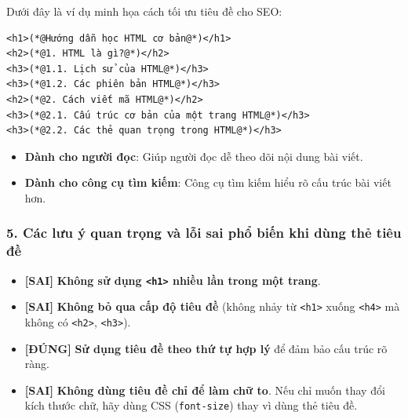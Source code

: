 \documentclass[11pt,oneside]{book}
\newcommand{\codeinline}[1]{\textcolor{accentOrange}{\texttt{#1}}}
\begin{document}
Dưới đây là ví dụ minh họa cách tối ưu tiêu đề cho SEO:

\begin{codeWindow}
\begin{lstlisting}[language=HTML5]
<h1>(*@Hướng dẫn học HTML cơ bản@*)</h1>
<h2>(*@1. HTML là gì?@*)</h2>
<h3>(*@1.1. Lịch sử của HTML@*)</h3>
<h3>(*@1.2. Các phiên bản HTML@*)</h3>
<h2>(*@2. Cách viết mã HTML@*)</h2>
<h3>(*@2.1. Cấu trúc cơ bản của một trang HTML@*)</h3>
<h3>(*@2.2. Các thẻ quan trọng trong HTML@*)</h3>
\end{lstlisting}
\end{codeWindow}

\begin{tipBox}
\begin{itemize}[leftmargin=1.5em, itemsep=2pt, parsep=0pt]
    \item \textbf{Dành cho người đọc}: Giúp người đọc dễ theo dõi nội dung bài viết.
    \item \textbf{Dành cho công cụ tìm kiếm}: Công cụ tìm kiếm hiểu rõ cấu trúc bài viết hơn.
\end{itemize}
\end{tipBox}

\subsubsection{5. Các lưu ý quan trọng và lỗi sai phổ biến khi dùng thẻ tiêu đề}

\begin{warnBox}
\begin{itemize}[leftmargin=1.5em, itemsep=3pt, parsep=0pt]
    \item \textcolor{codeKeyword}{\textbf{[SAI]}} \textbf{Không sử dụng \codeinline{<h1>} nhiều lần trong một trang}.
    \item \textcolor{codeKeyword}{\textbf{[SAI]}} \textbf{Không bỏ qua cấp độ tiêu đề} (không nhảy từ \codeinline{<h1>} xuống \codeinline{<h4>} mà không có \codeinline{<h2>}, \codeinline{<h3>}).
    \item \textcolor{codeString}{\textbf{[ĐÚNG]}} \textbf{Sử dụng tiêu đề theo thứ tự hợp lý} để đảm bảo cấu trúc rõ ràng.
    \item \textcolor{codeKeyword}{\textbf{[SAI]}} \textbf{Không dùng tiêu đề chỉ để làm chữ to}. Nếu chỉ muốn thay đổi kích thước chữ, hãy dùng CSS (\codeinline{font-size}) thay vì dùng thẻ tiêu đề.
\end{itemize}
\end{warnBox}
\end{document}
